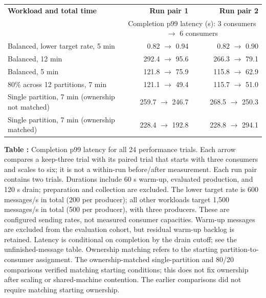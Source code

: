 \begin{center}
\small
\setlength{\tabcolsep}{4pt}
\begin{tabular*}{\linewidth}{@{\extracolsep{\fill}}lrr@{}}
\toprule
\textbf{Workload and total time} & \textbf{Run pair 1} & \textbf{Run pair 2}\\
 & \multicolumn{2}{c}{Completion p99 latency (s): 3 consumers $\rightarrow$ 6 consumers}\\
\midrule
Balanced, lower target rate, 5 min & 0.82 $\rightarrow$ 0.94 & 0.82 $\rightarrow$ 0.90\\
Balanced, 12 min & 292.4 $\rightarrow$ 95.6 & 266.3 $\rightarrow$ 79.1\\
Balanced, 5 min & 121.8 $\rightarrow$ 75.9 & 115.8 $\rightarrow$ 62.9\\
80\% across 12 partitions, 7 min & 121.1 $\rightarrow$ 49.4 & 115.7 $\rightarrow$ 51.0\\
Single partition, 7 min (ownership not matched) & 259.7 $\rightarrow$ 246.7 & 268.5 $\rightarrow$ 250.3\\
Single partition, 7 min (ownership matched) & 228.4 $\rightarrow$ 192.8 & 228.8 $\rightarrow$ 294.1\\
\bottomrule
\end{tabular*}
\label{tab:paired-p99}
\par\smallskip
\textbf{Table \thetable:} Completion p99 latency for all 24 performance trials. Each arrow compares a keep-three trial with its paired trial that starts with three consumers and scales to six; it is not a within-run before/after measurement. Each run pair contains two trials. Durations include 60 s warm-up, evaluated production, and 120 s drain; preparation and collection are excluded. The lower target rate is 600 messages/s in total (200 per producer); all other workloads target 1,500 messages/s in total (500 per producer), with three producers. These are configured sending rates, not measured consumer capacities. Warm-up messages are excluded from the evaluation cohort, but residual warm-up backlog is retained. Latency is conditional on completion by the drain cutoff; see the unfinished-message table. Ownership matching refers to the starting partition-to-consumer assignment. The ownership-matched single-partition and 80/20 comparisons verified matching starting conditions; this does not fix ownership after scaling or shared-machine contention. The earlier comparisons did not require matching starting ownership.
\end{center}

